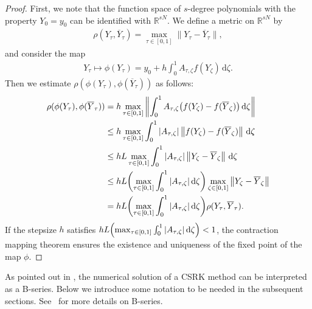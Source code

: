 \documentclass[final,leqno,onefignum,onetabnum]{siamltex1213}
\DeclarePairedDelimiter\paren{\lparen}{\rparen}
\begin{document}
\begin{proof}
First, we note that the function space
of $s$-degree polynomials with the property $Y_0=y_0$
can be identified with ${\mathbb R}^{sN}$.
We define a metric on ${\mathbb R}^{sN}$ by
\begin{align*}
\rho (Y_\tau, \overline{Y}_\tau ) = \max_{\tau\in[0,1]} \| Y_\tau - \overline{Y}_\tau \|,
\end{align*}
and consider the map
\begin{align*}
Y_\tau \mapsto \phi (Y_\tau) = y_0 + h\int_0^1 A_{\tau,\zeta} f(Y_\zeta)\,{\mathrm d}\zeta.
\end{align*}
Then we estimate $\rho (\phi (Y_\tau),\phi (\overline{Y}_\tau))$ as follows:
\begin{align*}
\rho (\phi (Y_\tau),\phi (\overline{Y}_\tau))
&=
h\max_{\tau\in[0,1]} \left\| \int_0^1 A_{\tau,\zeta}
\paren*{f(Y_\zeta)-f(\overline{Y}_\zeta)}\,{\mathrm d}\zeta \right\| \\
&\leq
h\max_{\tau\in[0,1]}  \int_0^1 |A_{\tau,\zeta}|
\left\| f(Y_\zeta)-f(\overline{Y}_\zeta)\right\|\,{\mathrm d}\zeta \\
&\leq
hL\max_{\tau\in[0,1]}  \int_0^1 |A_{\tau,\zeta}|
\left\| Y_\zeta-\overline{Y}_\zeta\right\|\,{\mathrm d}\zeta \\
&\leq
hL \paren*{\max_{\tau\in[0,1]}  \int_0^1 |A_{\tau,\zeta}|\,{\mathrm d}\zeta}
\max_{\zeta\in[0,1]} \left\| Y_\zeta-\overline{Y}_\zeta\right\| \\
&=
hL \paren*{\max_{\tau\in[0,1]}  \int_0^1 |A_{\tau,\zeta}|\,{\mathrm d}\zeta}
\rho (Y_\tau,\overline{Y}_\tau ).
\end{align*}
If the stepsize $h$ satisfies $hL \paren*{\max_{\tau\in[0,1]}  \int_0^1 |A_{\tau,\zeta}|\,{\mathrm d}\zeta}<1$,
the contraction mapping theorem ensures
the existence and uniqueness of the fixed point of the map $\phi$.
\end{proof}

As pointed out in \cite{ha10},
the numerical solution of a CSRK method
can be interpreted as a B-series.
Below we introduce some notation to be needed in the subsequent sections.
See~\cite{bu08,ha06} for more details on B-series.
\end{document}
